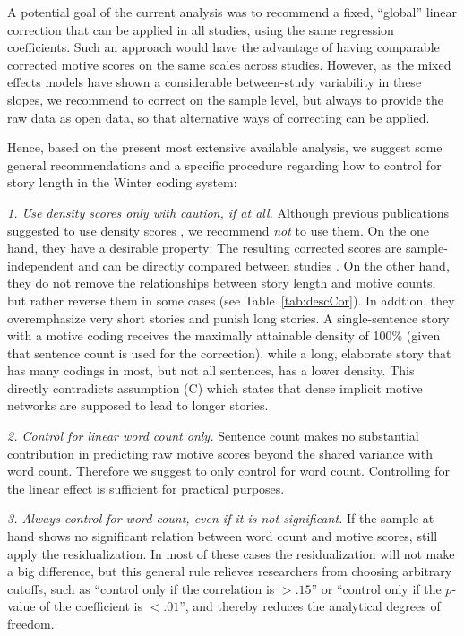 \documentclass[man,a4paper,mask]{apa6}\usepackage[]{graphicx}\usepackage[]{color}
\begin{document}
A potential goal of the current analysis was to recommend a fixed, ``global'' linear correction that can be applied in all studies, using the same regression coefficients. Such an approach would have the advantage of having comparable corrected motive scores on the same scales across studies. However, as the mixed effects models have shown a considerable between-study variability in these slopes, we recommend to correct on the sample level, but always to provide the raw data as open data, so that alternative ways of correcting can be applied.

Hence, based on the present most extensive available analysis, we suggest some general recommendations and a specific procedure regarding how to control for story length in the Winter coding system:

\emph{1. Use density scores only with caution, if at all.} Although previous publications suggested to use density scores \parencite[e.g., ][]{winter_MeasuringPersonalityDistance_1991}, we recommend \emph{not} to use them. On the one hand, they have a desirable property: The resulting corrected scores are sample-independent and can be directly compared between studies \parencite{schultheiss_MeasuringImplicitMotives_2007}. On the other hand, they do not remove the relationships between story length and motive counts, but rather reverse them in some cases (see Table~\ref{tab:descCor}). In addtion, they overemphasize very short stories and punish long stories. A single-sentence story with a motive coding receives the maximally attainable density of 100\% (given that sentence count is used for the correction), while a long, elaborate story that has many codings in most, but not all sentences, has a lower density. This directly contradicts assumption (C) which states that dense implicit motive networks are supposed to lead to longer stories.

\emph{2. Control for linear word count only.} Sentence count makes no substantial contribution in predicting raw motive scores beyond the shared variance with word count. Therefore we suggest to only control for word count. Controlling for the linear effect is sufficient for practical purposes.

\emph{3. Always control for word count, even if it is not significant.} If the sample at hand shows no significant relation between word count and motive scores, still apply the residualization. In most of these cases the residualization will not make a big difference, but this general rule relieves researchers from choosing arbitrary cutoffs, such as ``control only if the correlation is $> .15$'' or ``control only if the $p$-value of the coefficient is $<.01$'', and thereby reduces the analytical degrees of freedom.
\end{document}
